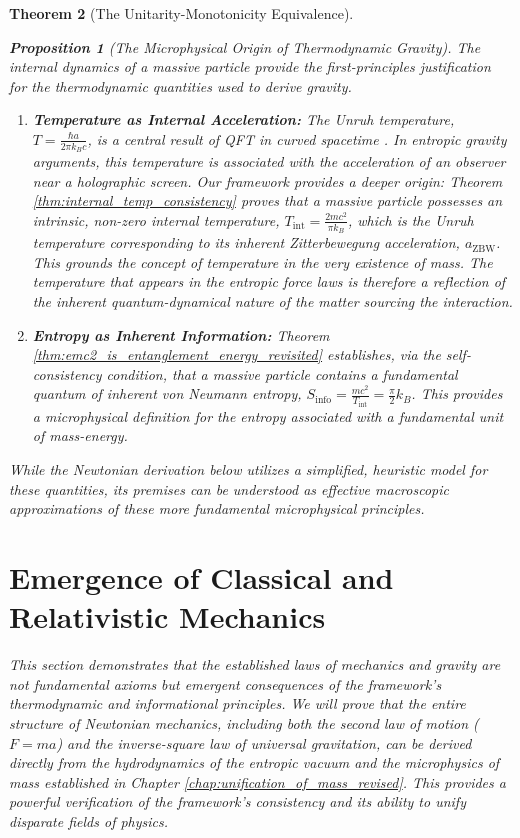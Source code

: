 \documentclass[11pt, letterpaper]{report}
\theoremstyle{plain} %
\newtheorem{theorem}{Theorem}[chapter]
\newtheorem{proposition}[theorem]{Proposition}
\theoremstyle{definition} %
\theoremstyle{remark} %
\begin{document}
\begin{theorem}[The Unitarity-Monotonicity Equivalence]
\begin{proposition}[The Microphysical Origin of Thermodynamic Gravity]
\label{prop:microphysical_origin_gravity}
The internal dynamics of a massive particle provide the first-principles justification for the thermodynamic quantities used to derive gravity.
\begin{enumerate}
    \item \textbf{Temperature as Internal Acceleration:} The Unruh temperature, $T = \frac{\hbar a}{2\pi k_B c}$, is a central result of QFT in curved spacetime \cite{Unruh1976}. In entropic gravity arguments, this temperature is associated with the acceleration of an observer near a holographic screen. Our framework provides a deeper origin: Theorem \ref{thm:internal_temp_consistency} proves that a massive particle possesses an intrinsic, non-zero internal temperature, $T_{\text{int}} = \frac{2mc^2}{\pi k_B}$, which is the Unruh temperature corresponding to its inherent Zitterbewegung acceleration, $a_{\text{ZBW}}$. This grounds the concept of temperature in the very existence of mass. The temperature that appears in the entropic force laws is therefore a reflection of the inherent quantum-dynamical nature of the matter sourcing the interaction.

    \item \textbf{Entropy as Inherent Information:} Theorem \ref{thm:emc2_is_entanglement_energy_revisited} establishes, via the self-consistency condition, that a massive particle contains a fundamental quantum of inherent von Neumann entropy, $S_{\text{info}} = \frac{mc^2}{T_{\text{int}}} = \frac{\pi}{2} k_B$. This provides a microphysical definition for the entropy associated with a fundamental unit of mass-energy.
\end{enumerate}
\end{proposition}
While the Newtonian derivation below utilizes a simplified, heuristic model for these quantities, its premises can be understood as effective macroscopic approximations of these more fundamental microphysical principles.

\section{Emergence of Classical and Relativistic Mechanics}
\label{sec:verify_mechanics}

This section demonstrates that the established laws of mechanics and gravity are not fundamental axioms but emergent consequences of the framework’s thermodynamic and informational principles. We will prove that the entire structure of Newtonian mechanics, including both the second law of motion ($F=ma$) and the inverse-square law of universal gravitation, can be derived directly from the hydrodynamics of the entropic vacuum and the microphysics of mass established in Chapter \ref{chap:unification_of_mass_revised}. This provides a powerful verification of the framework's consistency and its ability to unify disparate fields of physics.


\end{theorem}
\end{document}

